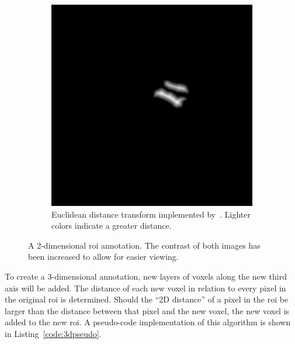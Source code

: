 \begin{figure}[H]
\begin{subfigure}[t]{0.4\textwidth}
        \includegraphics[width=\textwidth]{img/img_dist_mr1a.jpg}
        \caption{Euclidean distance transform implemented by~\cite{2020SciPy-NMeth}. Lighter colors indicate a greater distance.}\label{fig:2d-dist}
    \end{subfigure}
    \caption{A 2-dimensional \ac{roi} annotation. The contrast of both images has been increased to allow for easier viewing.}\label{fig:2d-annotation}
\end{figure}


To create a 3-dimensional annotation, new layers of voxels along the new
third axis will be added. The distance of each new voxel in relation to 
every pixel in the original \ac{roi} is determined. Should the 
\enquote{2D distance} of a pixel in the \ac{roi} be larger than the 
distance between that pixel and the new voxel, the new voxel is added to 
the new \ac{roi}. A pseudo-code implementation of this algorithm is shown
in Listing~\ref{code:3dpseudo}.

